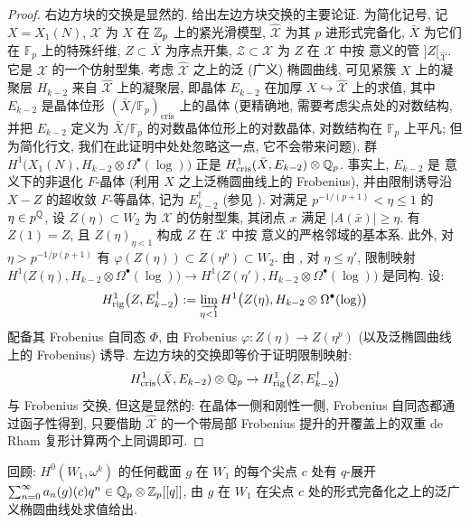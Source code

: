 \begin{proof}
右边方块的交换是显然的.
给出左边方块交换的主要论证.
为简化记号, 记 $X = X_1(N)$, $\mathcal{X}$ 为 $X$ 在 $\mathbb{Z}_p$ 上的紧光滑模型, $\widehat{\mathcal{X}}$ 为其 $p$ 进形式完备化, $\bar{X}$ 为它们在 $\mathbb{F}_p$ 上的特殊纤维, $Z \subset \bar{X}$ 为序点开集, $\mathcal{Z} \subset \mathcal{X}$ 为 $Z$ 在 $\mathcal{X}$ 中按 \cite[\S1]{ref:5} 意义的管 $]Z[_{\widehat{\mathcal{X}}}$.
它是 $\mathcal{X}$ 的一个仿射型集.
考虑 $\widehat{\mathcal{X}}$ 之上的泛 (广义) 椭圆曲线, 可见紧簇 $X$ 上的凝聚层 $H_{k-2}$ 来自 $\widehat{\mathcal{X}}$ 上的凝聚层, 即晶体 $E_{k-2}$ 在加厚 $X \hookrightarrow \widehat{\mathcal{X}}$ 上的求值, 其中 $E_{k-2}$ 是晶体位形 $(\bar{X}/\mathbb{F}_p)_{\mathrm{cris}}$ 上的晶体 (更精确地, 需要考虑尖点处的对数结构, 并把 $E_{k-2}$ 定义为 $\bar{X}/\mathbb{F}_p$ 的对数晶体位形上的对数晶体, 对数结构在 $\mathbb{F}_p$ 上平凡; 但为简化行文, 我们在此证明中处处忽略这一点, 它不会带来问题).
群 $H^{1}\bigl(X_1(N),H_{k-2} \otimes \Omega^{\bullet}(\log)\bigr)$ 正是 $H^{1}_{\mathrm{cris}}(\bar{X},E_{k-2}) \otimes \mathbb{Q}_p$.
事实上, $E_{k-2}$ 是 \cite[\S2.4.1]{ref:5} 意义下的非退化 $F$-晶体 (利用 $X$ 之上泛椭圆曲线上的 Frobenius), 并由限制诱导沿 $X - Z$ 的超收敛 $F$-等晶体, 记为 $E^{\dagger}_{k-2}$ (参见 \cite[\S2.3]{ref:5}).
对满足 $p^{-1/(p+1)} < \eta \le 1$ 的 $\eta \in p^{\mathbb{Q}}$, 设 $Z(\eta) \subset W_2$ 为 $\mathcal{X}$ 的仿射型集, 其闭点 $x$ 满足 $|A(\bar{x})| \ge \eta$.
有 $Z(1) = Z$, 且 $Z(\eta)_{\eta<1}$ 构成 $Z$ 在 $\mathcal{X}$ 中按 \cite[\S1.2]{ref:5} 意义的严格邻域的基本系.
此外, 对 $\eta > p^{-1/p(p+1)}$ 有 $\varphi(Z(\eta)) \subset Z(\eta^{p}) \subset W_2$.
由 \cite[Th.~2.4]{ref:2}, 对 $\eta \le \eta'$, 限制映射 $H^{1}\bigl(Z(\eta),H_{k-2} \otimes \Omega^{\bullet}(\log)\bigr) \to H^{1}\bigl(Z(\eta'),H_{k-2} \otimes \Omega^{\bullet}(\log)\bigr)$ 是同构.
设:
\[
H^{1}_{\mathrm{rig}}\bigl(Z,E^{\dagger}_{k-2}\bigr) := \varinjlim_{\eta<1} H^{1}\bigl(Z(\eta),H_{k-2} \otimes \Omega^{\bullet}(\log)\bigr)
\]
配备其 Frobenius 自同态 $\Phi$, 由 Frobenius $\varphi : Z(\eta) \to Z(\eta^{p})$ (以及泛椭圆曲线上的 Frobenius) 诱导.
左边方块的交换即等价于证明限制映射:
\[
H^{1}_{\mathrm{cris}}(\bar{X},E_{k-2}) \otimes \mathbb{Q}_p \to H^{1}_{\mathrm{rig}}\bigl(Z,E^{\dagger}_{k-2}\bigr)
\]
与 Frobenius 交换, 但这是显然的: 在晶体一侧和刚性一侧, Frobenius 自同态都通过函子性得到, 只要借助 $\widehat{\mathcal{X}}$ 的一个带局部 Frobenius 提升的开覆盖上的双重 de Rham 复形计算两个上同调即可.
\end{proof}

回顾: $H^{0}(W_1,\omega^{k})$ 的任何截面 $g$ 在 $W_1$ 的每个尖点 $c$ 处有 $q$-展开 $\sum_{n=0}^{\infty} a_n(g)(c)q^{n} \in \mathbb{Q}_p \otimes \mathbb{Z}_p[[q]]$, 由 $g$ 在 $W_1$ 在尖点 $c$ 处的形式完备化之上的泛广义椭圆曲线处求值给出.

